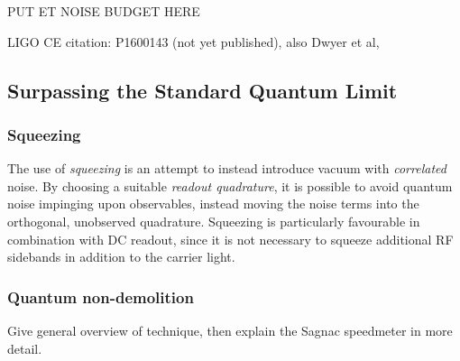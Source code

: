 PUT ET NOISE BUDGET HERE

LIGO CE citation: P1600143 (not yet published), also Dwyer et al, \cite{Dwyer2015}

\subsection{Surpassing the Standard Quantum Limit}

\subsubsection{Squeezing}
The use of \emph{squeezing} is an attempt to instead introduce vacuum with \emph{correlated} noise. By choosing a suitable \emph{readout quadrature}, it is possible to avoid quantum noise impinging upon observables, instead moving the noise terms into the orthogonal, unobserved quadrature. Squeezing is particularly favourable in combination with DC readout, since it is not necessary to squeeze additional \gls{RF} sidebands in addition to the carrier light.

\subsubsection{Quantum non-demolition}
Give general overview of technique, then explain the Sagnac speedmeter in more detail.